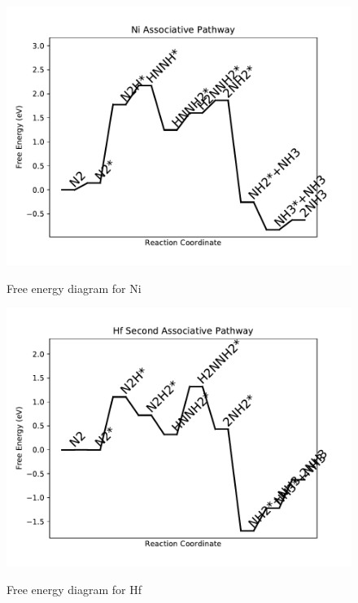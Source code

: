 \documentclass{article}
\begin{document}
\begin{figure}
\includegraphics[width=1\linewidth]{data/plots/Ni_associative.pdf}
\label{fig:Ni_associative}
\caption{Free energy diagram for Ni}
\end{figure}

\begin{figure}
\includegraphics[width=1\linewidth]{data/plots/Hf_associative_2.pdf}
\label{fig:Hf_associative_2}
\caption{Free energy diagram for Hf}
\end{figure}
\end{document}
